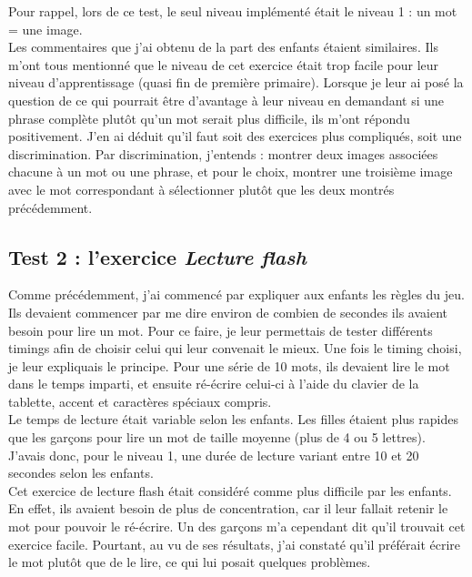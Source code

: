 Pour rappel, lors de ce test, le seul niveau implémenté était le niveau 1 : un mot = une image.\\

Les commentaires que j'ai obtenu de la part des enfants étaient similaires. Ils m'ont tous mentionné que le niveau de cet exercice était trop facile pour leur niveau d'apprentissage (quasi fin de première primaire). Lorsque je leur ai posé la question de ce qui pourrait être d'avantage à leur niveau en demandant si une phrase complète plutôt qu'un mot serait plus difficile, ils m'ont répondu positivement. J'en ai déduit qu'il faut soit des exercices plus compliqués, soit une discrimination. Par discrimination, j'entends : montrer deux images associées chacune à un mot ou une phrase, et pour le choix, montrer une troisième image avec le mot correspondant à sélectionner plutôt que les deux montrés précédemment.

\subsection{Test 2 : l'exercice \textit{Lecture flash} \label{testFlash}}
Comme précédemment, j'ai commencé par expliquer aux enfants les règles du jeu.
Ils devaient commencer par me dire environ de combien de secondes ils avaient besoin pour lire un mot. Pour ce faire, je leur permettais de tester différents timings afin de choisir celui qui leur convenait le mieux. Une fois le timing choisi, je leur expliquais le principe. Pour une série de 10 mots, ils devaient lire le mot dans le temps imparti, et ensuite ré-écrire celui-ci à l'aide du clavier de la tablette, accent et caractères spéciaux compris.\\

Le temps de lecture était variable selon les enfants. Les filles étaient plus rapides que les garçons pour lire un mot de taille moyenne (plus de 4 ou 5 lettres). J'avais donc, pour le niveau 1, une durée de lecture variant entre 10 et 20 secondes selon les enfants.\\

Cet exercice de lecture flash était considéré comme plus difficile par les enfants. En effet, ils avaient besoin de plus de concentration, car il leur fallait retenir le mot pour pouvoir le ré-écrire. Un des garçons m'a cependant dit qu'il trouvait cet exercice facile. Pourtant, au vu de ses résultats, j'ai constaté qu'il préférait écrire le mot plutôt que de le lire, ce qui lui posait quelques problèmes.\\

